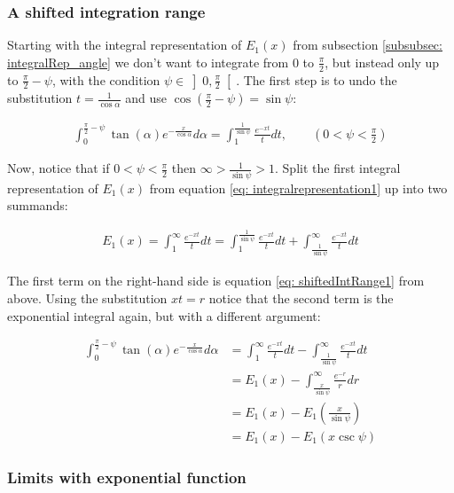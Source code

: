 \documentclass[bibliography=totocnumbered]{scrartcl}
\newcommand{\assume}[1][\text{MISSING PARAMETER}]{,\qquad\left(#1\right)}
\begin{document}
	\subsubsection{A shifted integration range}
	\label{subsubsec: shifted_intrange}

	Starting with the integral representation of $E_1\left(x\right)$ from subsection \ref{subsubsec: integralRep_angle} we don't want to integrate from $0$ to $\frac{\pi}{2}$, but instead only up to $\frac{\pi}{2}-\psi$, with the condition $\psi\in\left]0,\frac{\pi}{2}\right[$. The first step is to undo the substitution $t=\frac{1}{\cos\alpha}$ and use $\cos\left(\frac{\pi}{2}-\psi\right)=\sin\psi$:

	\begin{gather}
		\int_{0}^{\frac{\pi}{2}-\psi}\tan\left(\alpha\right)e^{-\frac{x}{\cos\alpha}}d\alpha=\int_{1}^{\frac{1}{\sin\psi}}\frac{e^{-xt}}{t}dt\assume[0<\psi<\frac{\pi}{2}]\label{eq: shiftedIntRange1}
	\end{gather}

	Now, notice that if $0<\psi<\frac{\pi}{2}$ then $\infty>\frac{1}{\sin\psi}>1$. Split the first integral representation of $E_1\left(x\right)$ from equation \eqref{eq: integralrepresentation1} up into two summands:

	\begin{gather}
		E_1\left(x\right)=\int_{1}^{\infty}\frac{e^{-xt}}{t}dt=\int_{1}^{\frac{1}{\sin\psi}}\frac{e^{-xt}}{t}dt+\int_{\frac{1}{\sin\psi}}^{\infty}\frac{e^{-xt}}{t}dt\label{eq: shiftedIntRange2}
	\end{gather}

	The first term on the right-hand side is equation \eqref{eq: shiftedIntRange1} from above. Using the substitution $xt=r$ notice that the second term is the exponential integral again, but with a different argument:

	\begin{align}
		\int_{0}^{\frac{\pi}{2}-\psi}\tan\left(\alpha\right)e^{-\frac{x}{\cos\alpha}}d\alpha&=\int_{1}^{\infty}\frac{e^{-xt}}{t}dt-\int_{\frac{1}{\sin\psi}}^{\infty}\frac{e^{-xt}}{t}dt\\
		&=E_1\left(x\right)-\int_{\frac{x}{\sin\psi}}^{\infty}\frac{e^{-r}}{r}dr\\
		&=E_1\left(x\right)-E_1\left(\frac{x}{\sin{\psi}}\right)\\
		&=E_1\left(x\right)-E_1\left(x\csc\psi\right)
	\end{align}

	\subsubsection{Limits with exponential function}
	\label{subsubsec: limit_withexpfunc}
\end{document}
